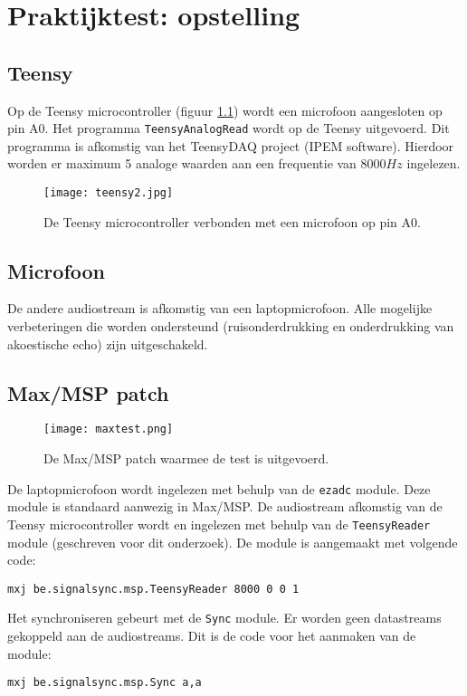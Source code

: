 \chapter{Praktijktest: opstelling}
\label{appendix-c}

\section*{Teensy}

Op de Teensy microcontroller (figuur \ref{teensy-test}) wordt een microfoon aangesloten op pin A0. Het programma \texttt{TeensyAnalogRead} wordt op de Teensy uitgevoerd. Dit programma is afkomstig van het TeensyDAQ project (IPEM software). Hierdoor worden er maximum 5 analoge waarden aan een frequentie van $8000Hz$ ingelezen.

\begin{figure}[!h]
	\captionsetup{width=0.7\textwidth}
	\caption[Teensy testopstelling]{De Teensy microcontroller verbonden met een microfoon op pin A0.}
	\centering
	\advance\parskip0.3cm
	\texttt{[image: teensy2.jpg]}
	\label{teensy-test}
\end{figure}

\section*{Microfoon}

De andere audiostream is afkomstig van een laptopmicrofoon. Alle mogelijke verbeteringen die worden ondersteund (ruisonderdrukking en onderdrukking van akoestische echo) zijn uitgeschakeld.

\section*{Max/MSP patch}

\begin{figure}[!h]
	\captionsetup{width=0.7\textwidth}
	\caption[Max/MSP testopstelling]{De Max/MSP patch waarmee de test is uitgevoerd.}
	\centering
	\advance\parskip0.3cm
	\texttt{[image: maxtest.png]}
	\label{max-test}
\end{figure}

De laptopmicrofoon wordt ingelezen met behulp van de \texttt{ezadc\textapprox} module. Deze module is standaard aanwezig in Max/MSP. De audiostream afkomstig van de Teensy microcontroller wordt en ingelezen met behulp van de \texttt{TeensyReader} module (geschreven voor dit onderzoek). De module is aangemaakt met volgende code:
\begin{center}
	\texttt{mxj\textapprox\ be.signalsync.msp.TeensyReader 8000 0 0 1}
\end{center}
Het synchroniseren gebeurt met de \texttt{Sync} module. Er worden geen datastreams gekoppeld aan de audiostreams. Dit is de code voor het aanmaken van de module:
\begin{center}
	\texttt{mxj\textapprox\ be.signalsync.msp.Sync a,a}
\end{center}

